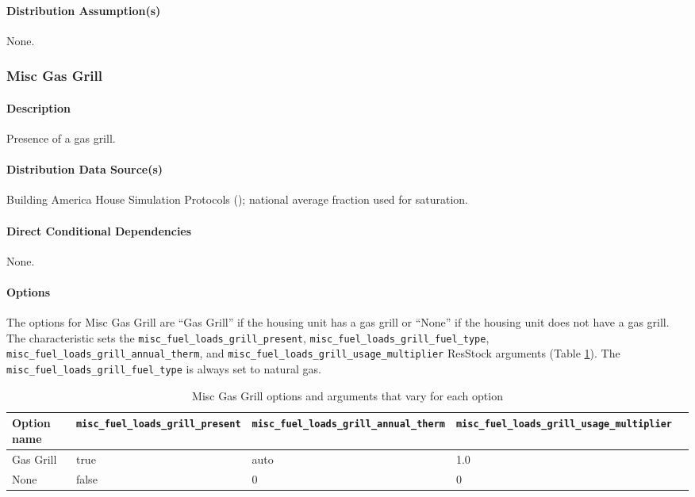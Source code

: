 \paragraph{Distribution Assumption(s)}
None.

\subsubsection{Misc Gas Grill}
\paragraph{Description}
Presence of a gas grill.

\paragraph{Distribution Data Source(s)}
Building America House Simulation Protocols (\cite{Wilson2014}); national average fraction used for saturation.

\paragraph{Direct Conditional Dependencies}
None.

\paragraph{Options}

The options for Misc Gas Grill are ``Gas Grill'' if the housing unit has a gas grill or ``None'' if the housing unit does not have a gas grill. The characteristic sets the \texttt{misc\_fuel\_loads\_grill\_present}, \texttt{misc\_fuel\_loads\_grill\_fuel\_type}, \texttt{misc\_fuel\_loads\_grill\_annual\_therm}, and \texttt{misc\_fuel\_loads\_grill\_usage\_multiplier} ResStock arguments (Table \ref{table:hc_opt_def_gas_grill}). The \texttt{misc\_fuel\_loads\_grill\_fuel\_type} is always set to natural gas.

\begin{longtable}[]{ |p{2.5cm}|p{3cm}|p{3cm}|p{3cm}|p{3cm}| }
\caption{Misc Gas Grill options and arguments that vary for each option} \label{table:hc_opt_def_gas_grill} \\
\toprule\noalign{}
Option name &
\texttt{misc\_fuel\_loads\_grill\_present} &
\texttt{misc\_fuel\_loads\_grill\_annual\_therm} &
\texttt{misc\_fuel\_loads\_grill\_usage\_multiplier} \\
\midrule\noalign{}
\endhead
\bottomrule\noalign{}
\endlastfoot
Gas Grill & true & auto & 1.0 \\
None & false & 0 & 0 \\
\end{longtable}

